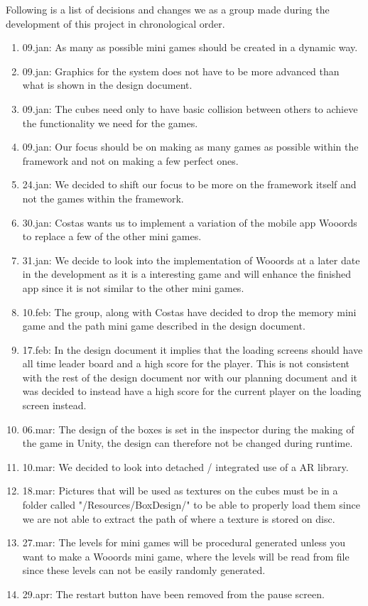 Following is a list of decisions and changes we as a group made during the development of this project in chronological order.

\begin{enumerate}
	\item 09.jan: As many as possible mini games should be created in a dynamic way.
	\item 09.jan: Graphics for the system does not have to be more advanced than what is shown in the design document.
	\item 09.jan: The cubes need only to have basic collision between others to achieve the functionality we need for the games.
	\item 09.jan: Our focus should be on making as many games as possible within the framework and not on making  a few perfect ones.
	\item 24.jan: We decided to shift our focus to be more on the framework itself and not the games within the framework.
	\item 30.jan: Costas wants us to implement a variation of the mobile app Wooords to replace a few of the other mini games.
	\item 31.jan: We decide to look into the implementation of Wooords at a later date in the development as it is a interesting game and will enhance the finished app since it is not similar to the other mini games.
	\item 10.feb: The group, along with Costas have decided to drop the memory mini game and the path mini game described in the design document.
	\item 17.feb: In the design document it implies that the loading screens should have all time leader board and a high score for the player. This is not consistent with the rest of the design document nor with our planning document and it was decided to instead have a high score for the current player on the loading screen instead.
	\item 06.mar: The design of the boxes is set in the inspector during the making of the game in Unity, the design can therefore not be changed during runtime.
	\item 10.mar: We decided to look into detached / integrated use of a AR library.
	\item 18.mar: Pictures that will be used as textures on the cubes must be in a folder called "/Resources/BoxDesign/" to be able to properly load them since we are not able to extract the path of where a texture is stored on disc.
	\item 27.mar: The levels for mini games will be procedural generated unless you want to make a Wooords mini game, where the levels will be read from file since these levels can not be easily randomly generated.
	\item 29.apr: The restart button have been removed from the pause screen.
\end{enumerate}


